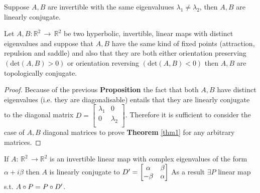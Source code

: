 \documentclass[../main.tex]{subfiles}
\begin{document}
\begin{corollary}
     Suppose $A,B$ are invertible with the same eigenvaluues $\lambda_{1}\neq \lambda_{2}$, then $A,B$ are linearly conjugate.
\end{corollary}

\begin{theorem}[label=thm1]{}{}
     Let $A,B:\mathbb{R}^{2}\,\to\,\mathbb{R}^{2}$ be two hyperbolic, invertible, linear maps with distinct eigenvalues and suppose that $A,B$ have the same kind of fixed points (attraction, repulsion and saddle) and also that they are both either orientation preserving $(\text{det}(A,B)>0)$ or orientation reversing $(\text{det}(A,B)<0)$ then $A,B$ are topologically conjugate.
\end{theorem}
\begin{proof}
     Because of the previous \textbf{Proposition} the fact that both $A,B$ have distinct eigenvalues (i.e. they are diagonalisable) entails that they are linearly conjugate to the diagonal matrix $D=\begin{bmatrix}
             \lambda_{1} & 0 \\
             0 & \lambda_{2} \\
     \end{bmatrix}$.
Therefore it is sufficient to consider the case of $A,B$ diagonal matrices to prove \textbf{Theorem} \ref{thm1} for any arbitrary matrices.
\end{proof}
\begin{proposition*}
     If $A:\,\mathbb{R}^{2}\,\to \mathbb{R}^{2}$ is an invertible linear map with complex eigenvalues of the form $\alpha + i \beta$ then $A$ is linearly conjugate to $D'=\begin{bmatrix}
             \alpha & \beta \\
             -\beta & \alpha
     \end{bmatrix}$
     As a result $\exists P$ linear map s.t. $A \circ P = P \circ D'$.
\end{proposition*}
\end{document}
